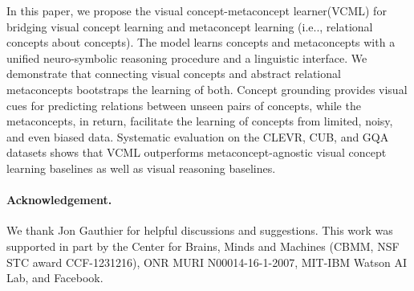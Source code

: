 \documentclass{article}
\makeatletter
\DeclareRobustCommand\onedot{\futurelet\@let@token\@onedot}
\def\@onedot{\ifx\@let@token.\else.\null\fi\xspace}
\def\ie{i.e\onedot} \def\Ie{I.e\onedot}
\newcommand{\modelfull}{visual concept-metaconcept learner\xspace}
\newcommand{\model}{VCML\xspace}
\makeatother
\begin{document}
In this paper, we propose the \modelfull (\model) for bridging visual concept learning and metaconcept learning (\ie, relational concepts about concepts). The model learns concepts and metaconcepts with a unified neuro-symbolic reasoning procedure and a linguistic interface. We demonstrate that connecting visual concepts and abstract relational metaconcepts bootstraps the learning of both. Concept grounding provides visual cues for predicting relations between unseen pairs of concepts, while the metaconcepts, in return, facilitate the learning of concepts from limited, noisy, and even biased data. Systematic evaluation on the CLEVR, CUB, and GQA datasets shows that \model outperforms metaconcept-agnostic visual concept learning baselines as well as visual reasoning baselines. \paragraph{Acknowledgement.}
We thank Jon Gauthier for helpful discussions and suggestions. This work was supported in part by the Center for Brains, Minds and Machines (CBMM, NSF STC award CCF-1231216), ONR MURI N00014-16-1-2007, MIT-IBM Watson AI Lab, and Facebook. 
{
\small


}
\end{document}
